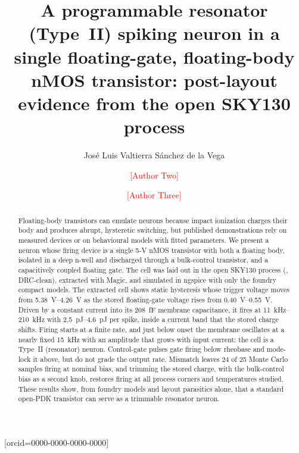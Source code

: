 \documentclass[a4paper,fleqn]{cas-dc}
\newcommand{\TBD}[1]{\textcolor{red}{[#1]}}
\begin{document}
\let\WriteBookmarks\relax
\def\floatpagepagefraction{1}
\def\textpagefraction{.001}


\title [mode = title]{A programmable resonator (Type~II) spiking neuron in a single floating-gate, floating-body nMOS transistor: post-layout evidence from the open SKY130 process}

\author[1]{Jos\'e Luis Valtierra S\'anchez de la Vega}[orcid=0000-0000-0000-0000]
\cormark[1]
\credit{\TBD{Conceptualization, Methodology, Software, Writing -- original draft}}

\author[1]{\TBD{Author Two}}
\credit{\TBD{Investigation, Validation}}

\author[1]{\TBD{Author Three}}
\credit{\TBD{Supervision, Writing -- review \& editing}}



\begin{abstract}
Floating-body transistors can emulate neurons because impact ionization charges their body and produces abrupt, hysteretic switching, but published demonstrations rely on measured devices or on behavioural models with fitted parameters. We present a neuron whose firing device is a single 5-V nMOS transistor with both a floating body, isolated in a deep n-well and discharged through a bulk-control transistor, and a capacitively coupled floating gate. The cell was laid out in the open SKY130 process (, DRC-clean), extracted with Magic, and simulated in ngspice with only the foundry compact models. The extracted cell shows static hysteresis whose trigger voltage moves from \SIrange{5.38}{4.26}{V} as the stored floating-gate voltage rises from \SIrange{0.40}{0.55}{V}. Driven by a constant current into its \SI{208}{fF} membrane capacitance, it fires at \SIrange{11}{210}{kHz} with \SIrange{2.5}{4.6}{pJ} per spike, inside a current band that the stored charge shifts. Firing starts at a finite rate, and just below onset the membrane oscillates at a nearly fixed \SI{15}{kHz} with an amplitude that grows with input current: the cell is a Type~II (resonator) neuron. Control-gate pulses gate firing below rheobase and mode-lock it above, but do not grade the output rate. Mismatch leaves 24 of 25 Monte Carlo samples firing at nominal bias, and trimming the stored charge, with the bulk-control bias as a second knob, restores firing at all process corners and temperatures studied. These results show, from foundry models and layout parasitics alone, that a standard open-PDK transistor can serve as a trimmable resonator neuron.
\end{abstract}
\end{document}
